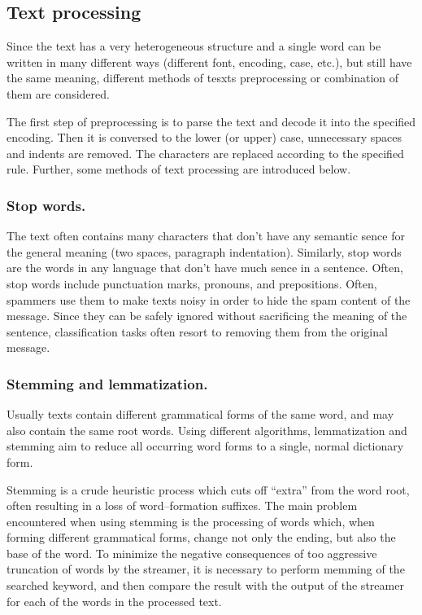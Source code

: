 \documentclass[12pt]{jpconf}
\begin{document}
\subsection{Text processing}
Since the text has a very heterogeneous structure and a single word can be written in many different ways (different font, encoding, case, etc.), but still have the same meaning, different methods of tesxts preprocessing or combination of them are considered.

The first step of preprocessing is to parse the text and decode it into the specified encoding. Then it is conversed to the lower (or upper) case, unnecessary spaces and indents are removed. The characters are replaced according to the specified rule. Further, some methods of text processing are introduced below.

\subsubsection*{Stop words.}
The text often contains many characters that don't have any semantic sence for the general meaning (two spaces, paragraph indentation).
Similarly, stop words are the words in any language that don't have much sence in a sentence. Often, stop words include punctuation marks, pronouns, and prepositions. Often, spammers use them to make texts noisy in order to hide the spam content of the message. Since they can be safely ignored without sacrificing the meaning of the sentence, classification tasks often resort to removing them from the original message.

\subsubsection*{Stemming and lemmatization.}
Usually texts contain different grammatical forms of the same word, and may also contain the same root words. Using different algorithms, lemmatization and stemming aim to reduce all occurring word forms to a single, normal dictionary form.

Stemming is a crude heuristic process which cuts off ``extra'' from the word root, often resulting in a loss of word--formation suffixes. The main problem encountered when using stemming is the processing of words which, when forming different grammatical forms, change not only the ending, but also the base of the word. To minimize the negative consequences of too aggressive truncation of words by the streamer, it is necessary to perform memming of the searched keyword, and then compare the result with the output of the streamer for each of the words in the processed text. 
\end{document}
